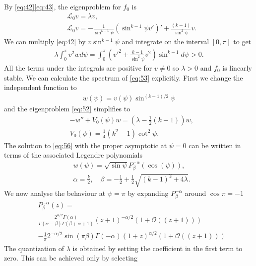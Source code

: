 By \eqref{eq:42}\eqref{eq:43}, the eigenproblem for $f_0$ is
\begin{align}
  \label{eq:52}
  &\mathcal{L}_0 v = \lambda v, \\
  \label{eq:53}
  &\mathcal{L}_0 v = -\frac{1}{\sin^{k-1}\psi}\left(\sin^{k-1}\psi
    v'\right)'+\frac{(k-1)}{\sin^2\psi}v.
\end{align}
We can multiply \eqref{eq:42} by $v\sin^{k-1}\psi$ and integrate on
the interval $[0,\pi]$ to get
\begin{align}\label{eq:54}
  \lambda\int_0^\pi v^2w
  d\psi=\int_0^\pi\left(v'^2+\frac{k-1}{\sin^2\psi}v^2\right)\sin^{k-1}d\psi>0.
\end{align}
All the terms under the integrals are positive for $v\ne0$ so
$\lambda>0$ and $f_0$ is linearly stable. We can calculate the
spectrum of \eqref{eq:53} explicitly. First we change the independent
function to
\begin{align}
  \label{eq:55}
  w(\psi)= v(\psi)\sin^{(k-1)/2}\psi
\end{align}
and the eigenproblem \eqref{eq:52} simplifies to
\begin{align}
  \label{eq:56}
  &-w''+V_0(\psi)w=\left(\lambda-\frac{1}{2}(k-1)\right)w,\\
  &V_0(\psi)=\frac{1}{4}(k^2-1)\cot^2\psi.
\end{align}
The solution to \eqref{eq:56} with the proper asymptotic at $\psi=0$
can be written in terms of the associated Legendre polynomials
\begin{align}
  \label{eq:57}
  &w(\psi)=\sqrt{\sin\psi}P^{-\alpha}_{\beta}(\cos(\psi)),\\
  \label{eq:58}
  &\alpha=\frac{k}{2},\quad \beta=-\frac{1}{2}+\frac{1}{2}\sqrt{(k-1)^2+4\lambda}.
\end{align}
We now analyse the behaviour at $\psi=\pi$ by expanding
$P_\beta^{-\alpha}$ around $\cos\pi=-1$
\begin{align}
  \label{eq:59}
  \begin{split}
    &P_\beta^{-\alpha}(z)=\\
    &\frac{2^{\alpha/2}\Gamma(\alpha)}{\Gamma(\alpha-\beta)\Gamma(\beta+\alpha+1)}
    (z+1)^{-\alpha/2}(1+\mathcal{O}((z+1)))\\
    &-\frac{1}{\pi}2^{-\alpha/2}\sin(\pi\beta)\Gamma(-\alpha)
    (1+z)^{\alpha/2}(1+\mathcal{O}((z+1)))
  \end{split}
\end{align}
The quantization of $\lambda$ is obtained by setting the coefficient
in the first term to zero. This can be achieved only by selecting
